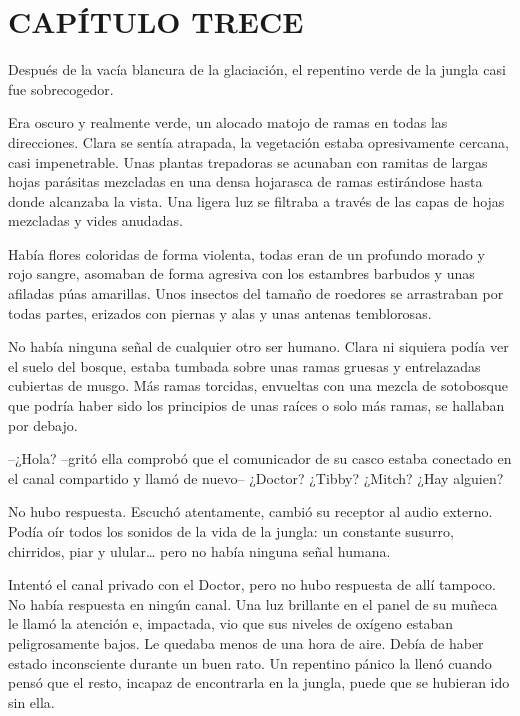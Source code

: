 \chapter*{CAPÍTULO TRECE}

{Después de la vacía blancura de la glaciación, el repentino verde de la
jungla casi fue sobrecogedor.}

{Era oscuro y realmente verde, un alocado matojo de ramas en todas las
 direcciones. Clara se sentía atrapada, la vegetación estaba
 opresivamente cercana, casi impenetrable. Unas plantas trepadoras se
 acunaban con ramitas de largas hojas parásitas mezcladas en una densa
 hojarasca de ramas estirándose hasta donde alcanzaba la vista. Una
 ligera luz se filtraba a través de las capas de hojas mezcladas y vides
anudadas.}

{Había flores coloridas de forma violenta, todas eran de un profundo
 morado y rojo sangre, asomaban de forma agresiva con los estambres
 barbudos y unas afiladas púas amarillas. Unos insectos del tamaño de
 roedores se arrastraban por todas partes, erizados con piernas y alas y
unas antenas temblorosas.}

{No había ninguna señal de cualquier otro ser humano. Clara ni siquiera
 podía ver el suelo del bosque, estaba tumbada sobre unas ramas gruesas y
 entrelazadas cubiertas de musgo. Más ramas torcidas, envueltas con una
 mezcla de sotobosque que podría haber sido los principios de unas raíces
o solo más ramas, se hallaban por debajo.}

{--¿Hola? --gritó ella comprobó que el comunicador de su casco estaba
 conectado en el canal compartido y llamó de nuevo-- ¿Doctor? ¿Tibby?
¿Mitch? ¿Hay alguien?}

{No hubo respuesta. Escuchó atentamente, cambió su receptor al audio
 externo. Podía oír todos los sonidos de la vida de la jungla: un
 constante susurro, chirridos, piar y ulular\ldots{} pero no había
ninguna señal humana.}

{Intentó el canal privado con el Doctor, pero no hubo respuesta de allí
 tampoco. No había respuesta en ningún canal. Una luz brillante en el
 panel de su muñeca le llamó la atención e, impactada, vio que sus
 niveles de oxígeno estaban peligrosamente bajos. Le quedaba menos de una
 hora de aire. Debía de haber estado inconsciente durante un buen rato.
 Un repentino pánico la llenó cuando pensó que el resto, incapaz de
encontrarla en la jungla, puede que se hubieran ido sin ella.}

